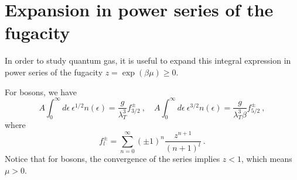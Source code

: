\section{Expansion in power series of the fugacity}

    In order to study quantum gas, it is useful to expand this integral expression in power series of the fugacity $z = \exp(\beta \mu) \geq 0$. 

    For bosons, we have
    \begin{equation}\label{ser}
        A \int_0^\infty d\epsilon ~ \epsilon^{1/2} n(\epsilon) = \frac{g}{\lambda_T^3} f_{3/2}^\pm ~, \quad A \int_0^\infty d\epsilon ~ \epsilon^{3/2} n(\epsilon) = \frac{g}{\lambda_T^3 \beta} f_{5/2}^{\pm} ~,
    \end{equation}
    where 
    \begin{equation}\label{ser2}
        f_l^\pm = \sum_{n=0}^\infty (\pm 1)^n \frac{z^{n+1}}{(n+1)^l} ~.
    \end{equation}
    Notice that for bosons, the convergence of the series implies $z < 1$, which means $\mu > 0$.
